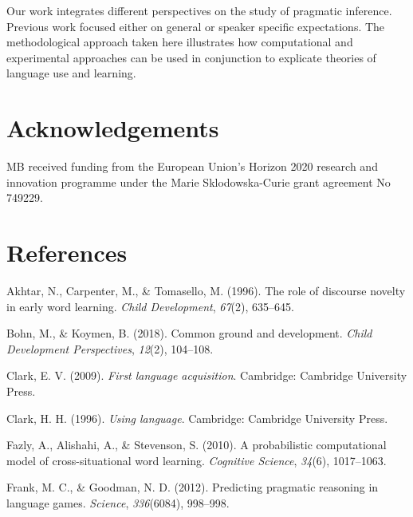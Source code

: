 \documentclass[10pt, letterpaper]{article}
\begin{document}
Our work integrates different perspectives on the study of pragmatic
inference. Previous work focused either on general or speaker specific
expectations. The methodological approach taken here illustrates how
computational and experimental approaches can be used in conjunction to
explicate theories of language use and learning.

\vspace{1em}
\vspace{1em}

\section{Acknowledgements}\label{acknowledgements}

MB received funding from the European Union's Horizon 2020 research and
innovation programme under the Marie Sklodowska-Curie grant agreement No
749229.

\section{References}\label{references}

\setlength{\parindent}{-0.1in} \setlength{\leftskip}{0.125in} \noindent

\hypertarget{refs}{}
\hypertarget{ref-akhtar1996role}{}
Akhtar, N., Carpenter, M., \& Tomasello, M. (1996). The role of
discourse novelty in early word learning. \emph{Child Development},
\emph{67}(2), 635--645.

\hypertarget{ref-bohn2018common}{}
Bohn, M., \& Koymen, B. (2018). Common ground and development.
\emph{Child Development Perspectives}, \emph{12}(2), 104--108.

\hypertarget{ref-clark2009first}{}
Clark, E. V. (2009). \emph{First language acquisition}. Cambridge:
Cambridge University Press.

\hypertarget{ref-clark1996using}{}
Clark, H. H. (1996). \emph{Using language}. Cambridge: Cambridge
University Press.

\hypertarget{ref-fazly2010probabilistic}{}
Fazly, A., Alishahi, A., \& Stevenson, S. (2010). A probabilistic
computational model of cross-situational word learning. \emph{Cognitive
Science}, \emph{34}(6), 1017--1063.

\hypertarget{ref-frank2012predicting}{}
Frank, M. C., \& Goodman, N. D. (2012). Predicting pragmatic reasoning
in language games. \emph{Science}, \emph{336}(6084), 998--998.
\end{document}
